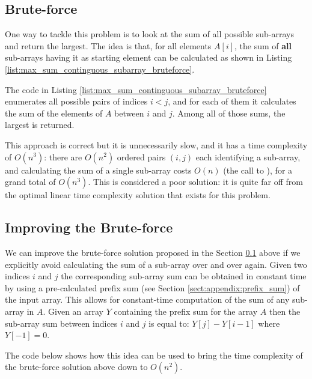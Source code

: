 \subsection{Brute-force}
\label{sec:max_sum_continguous_subarray_bruteforce}
One way to tackle this problem is to look at the sum of all possible sub-arrays and return the largest.
The idea is that, for all elements $A[i]$, the sum of \textbf{all} sub-arrays having it as starting element can be calculated as shown in Listing
\ref{list:max_sum_continguous_subarray_bruteforce}.




The code in Listing \ref{list:max_sum_continguous_subarray_bruteforce} enumerates all possible pairs of indices $i < j$, and for each of them it calculates the sum of the elements of $A$ between $i$ and $j$. Among all of those sums, the largest is returned. 

This approach is correct but it is unnecessarily slow, and it has a time complexity of $O(n^3)$: there are $O(n^2)$ ordered pairs $(i,j)$ each identifying a sub-array, and calculating the sum of a single sub-array costs $O(n)$ (the call to ), for a grand total of $O(n^3)$. 
This is considered a poor solution: it is quite far off from the optimal linear time complexity solution that exists for this problem.



\subsection{Improving the Brute-force}
\label{max_sum_continguous_subarray:sec:bruteforce_improved}
We can improve the brute-force solution proposed in the Section \ref{sec:max_sum_continguous_subarray_bruteforce} above if we explicitly avoid calculating the sum of a sub-array over and over again.
Given two indices $i$ and $j$ the corresponding sub-array sum can be obtained in constant time by using a pre-calculated prefix sum (see Section \ref{sect:appendix:prefix_sum}) of the input array.
This allows for constant-time computation of the sum of any sub-array in $A$. Given an array $Y$ containing the prefix sum for the
array $A$ then the sub-array sum between indices $i$ and $j$ is equal to: $Y[j]-Y[i-1]$ where $Y[-1] = 0$.

The code below shows how this idea can be used to bring the time complexity of the brute-force solution above down to $O(n^2)$. 

